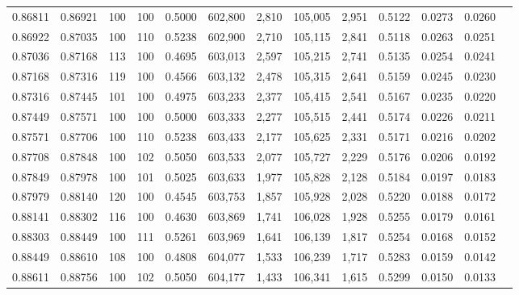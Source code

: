 \begin{tabular}{rrrrrrrrrrrrr}
0.86811 & 0.86921 &   100 & 100 &                                     0.5000 & 602,800 &   2,810 & 105,005 &   2,951 & 0.5122 & 0.0273 & 0.0260 \\
0.86922 & 0.87035 &   100 & 110 &                                     0.5238 & 602,900 &   2,710 & 105,115 &   2,841 & 0.5118 & 0.0263 & 0.0251 \\
0.87036 & 0.87168 &   113 & 100 &                                     0.4695 & 603,013 &   2,597 & 105,215 &   2,741 & 0.5135 & 0.0254 & 0.0241 \\
0.87168 & 0.87316 &   119 & 100 &                                     0.4566 & 603,132 &   2,478 & 105,315 &   2,641 & 0.5159 & 0.0245 & 0.0230 \\
0.87316 & 0.87445 &   101 & 100 &                                     0.4975 & 603,233 &   2,377 & 105,415 &   2,541 & 0.5167 & 0.0235 & 0.0220 \\
0.87449 & 0.87571 &   100 & 100 &                                     0.5000 & 603,333 &   2,277 & 105,515 &   2,441 & 0.5174 & 0.0226 & 0.0211 \\
0.87571 & 0.87706 &   100 & 110 &                                     0.5238 & 603,433 &   2,177 & 105,625 &   2,331 & 0.5171 & 0.0216 & 0.0202 \\
0.87708 & 0.87848 &   100 & 102 &                                     0.5050 & 603,533 &   2,077 & 105,727 &   2,229 & 0.5176 & 0.0206 & 0.0192 \\
0.87849 & 0.87978 &   100 & 101 &                                     0.5025 & 603,633 &   1,977 & 105,828 &   2,128 & 0.5184 & 0.0197 & 0.0183 \\
0.87979 & 0.88140 &   120 & 100 &                                     0.4545 & 603,753 &   1,857 & 105,928 &   2,028 & 0.5220 & 0.0188 & 0.0172 \\
0.88141 & 0.88302 &   116 & 100 &                                     0.4630 & 603,869 &   1,741 & 106,028 &   1,928 & 0.5255 & 0.0179 & 0.0161 \\
0.88303 & 0.88449 &   100 & 111 &                                     0.5261 & 603,969 &   1,641 & 106,139 &   1,817 & 0.5254 & 0.0168 & 0.0152 \\
0.88449 & 0.88610 &   108 & 100 &                                     0.4808 & 604,077 &   1,533 & 106,239 &   1,717 & 0.5283 & 0.0159 & 0.0142 \\
0.88611 & 0.88756 &   100 & 102 &                                     0.5050 & 604,177 &   1,433 & 106,341 &   1,615 & 0.5299 & 0.0150 & 0.0133 \\

\end{tabular}

